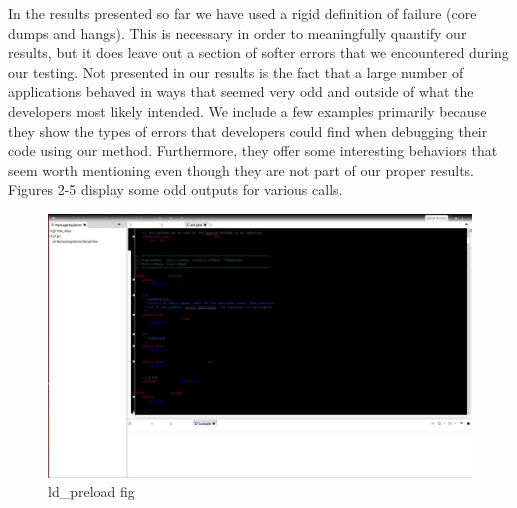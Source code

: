 In the results presented so far we have used a rigid definition of failure (core dumps and hangs). This is necessary in order to meaningfully quantify our results, but it does leave out a section of softer errors that we encountered during our testing. Not presented in our results is the fact that a large number of applications behaved in ways that seemed very odd and outside of what the developers most likely intended. We include a few examples primarily because they show the types of errors that developers could find when debugging their code using our method. Furthermore, they offer some interesting behaviors that seem worth mentioning even though they are not part of our proper results. Figures 2-5 display some odd outputs for various calls.

\begin{figure}
	\caption{ld\_preload fig}
	\includegraphics[width=\textwidth]{weird_eclipse.jpg}
\end{figure}